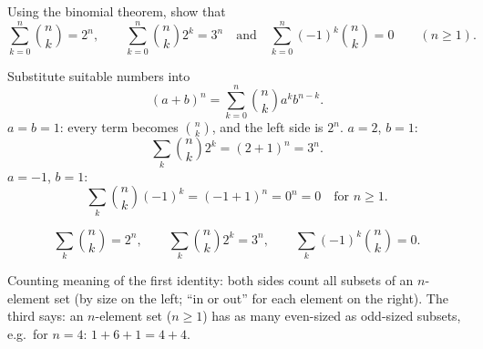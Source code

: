 
\begin{problem}
	Using the binomial theorem, show that
	\[ \sum_{k=0}^n\binom nk=2^n,\qquad
		\sum_{k=0}^n\binom nk2^k=3^n \quad\text{and}\quad
		\sum_{k=0}^n(-1)^k\binom nk=0 \qquad (n\ge1). \]
\end{problem}

\begin{solution}
	\idea Substitute suitable numbers into
	\[ (a+b)^n=\sum_{k=0}^n\binom nk a^kb^{n-k}. \]
	 $a=b=1$: every term becomes $\binom nk$, and the left
	side is $2^n$.
	 $a=2$, $b=1$:
	\[ \sum_k\binom nk2^k=(2+1)^n=3^n. \]
	 $a=-1$, $b=1$:
	\[ \sum_k\binom nk(-1)^k=(-1+1)^n=0^n=0 \quad\text{for } n\ge1. \]
	\begin{answer}
		\[ \sum_k\binom nk=2^n,\qquad \sum_k\binom nk2^k=3^n,\qquad
			\sum_k(-1)^k\binom nk=0. \]
	\end{answer}
	\begin{remark}
		Counting meaning of the first identity: both sides count all subsets of an
		$n$-element set (by size on the left; ``in or out'' for each element on the
		right). The third says: an $n$-element set ($n\ge1$) has as many
		even-sized as odd-sized subsets, e.g.\ for $n=4$: $1+6+1=4+4$.
	\end{remark}
\end{solution}
